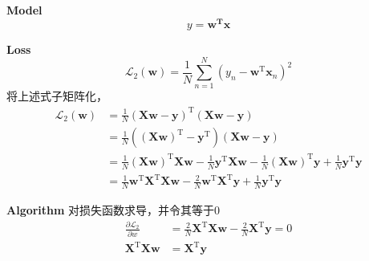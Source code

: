 \documentclass[UTF8]{ctexart}
\begin{document}
\textbf{Model}  
\begin{equation*}
    y=\boldsymbol{w^Tx}    
\end{equation*}

\textbf{Loss} 
\begin{equation*}
    \mathcal{L}_2(\boldsymbol{w})=\frac{1}{N} \sum_{n=1}^{N}\left(y_{n}-\boldsymbol{w}^{\mathrm{T}} \boldsymbol{x}_{n}\right)^{2}    
\end{equation*}
将上述式子矩阵化，
\begin{equation*}
    \begin{aligned}
		\mathcal{L}_2(\boldsymbol{w}) &=\frac{1}{N}(\boldsymbol{X} \boldsymbol{w}-\boldsymbol{y})^{\mathrm{T}}(\boldsymbol{X} \boldsymbol{w}-\boldsymbol{y}) \\
		&=\frac{1}{N}\left((\boldsymbol{X} \boldsymbol{w})^{\mathrm{T}}-\boldsymbol{y}^{\mathrm{T}}\right)(\boldsymbol{X} \boldsymbol{w}-\boldsymbol{y}) \\
		&=\frac{1}{N}(\boldsymbol{X} \boldsymbol{w})^{\mathrm{T}} \boldsymbol{X} \boldsymbol{w}-\frac{1}{N} \boldsymbol{y}^{\mathrm{T}} \boldsymbol{X} \boldsymbol{w}-\frac{1}{N}(\boldsymbol{X} \boldsymbol{w})^{\mathrm{T}} \boldsymbol{y}+\frac{1}{N} \boldsymbol{y}^{\mathrm{T}} \boldsymbol{y} \\
		&=\frac{1}{N} \boldsymbol{w}^{\mathrm{T}} \boldsymbol{X}^{\mathrm{T}} \boldsymbol{X} \boldsymbol{w}-\frac{2}{N} \boldsymbol{w}^{\mathrm{T}} \boldsymbol{X}^{\mathrm{T}} \boldsymbol{y}+\frac{1}{N} \boldsymbol{y}^{\mathrm{T}} \boldsymbol{y}
		\end{aligned}
\end{equation*}

\textbf{Algorithm} 对损失函数求导，并令其等于0
\begin{equation*}
    \begin{aligned}
		\frac{\partial \mathcal{L}_2}{\partial w} &=\frac{2}{N} \boldsymbol{X}^{\mathrm{T}} \boldsymbol{X} \boldsymbol{w}-\frac{2}{N} \boldsymbol{X}^{\mathrm{T}} \boldsymbol{y}=0 \\
		\boldsymbol{X}^{\mathrm{T}} \boldsymbol{X} \boldsymbol{w} &=\boldsymbol{X}^{\mathrm{T}} \boldsymbol{y}
		\end{aligned}
\end{equation*}
\end{document}
